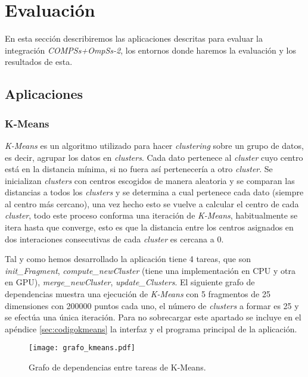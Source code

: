 \section{Evaluación}
\label{sec:estudiorend}

En esta sección describiremos las aplicaciones descritas para evaluar la integración \textit{COMPSs+OmpSs-2}, los entornos donde haremos la evaluación y los resultados de esta.  

\subsection{Aplicaciones}
\subsubsection{K-Means}

\textit{K-Means} es un algoritmo utilizado para hacer \textit{clustering} sobre un grupo de datos, es decir, agrupar los datos en \textit{clusters}. Cada dato pertenece al \textit{cluster} cuyo centro está en la distancia mínima, si no fuera así pertenecería a otro \textit{cluster}. Se inicializan \textit{clusters} con centros escogidos de manera aleatoria y se comparan las distancias a todos los \textit{clusters} y se determina a cual pertenece cada dato (siempre al centro más cercano), una vez hecho esto se vuelve a calcular el centro de cada \textit{cluster}, todo este proceso conforma una iteración de \textit{K-Means}, habitualmente se itera hasta que converge, esto es que la distancia entre los centros asignados en dos interaciones consecutivas de cada \textit{cluster} es cercana a 0.
\par\bigskip
Tal y como hemos desarrollado la aplicación tiene 4 tareas, que son \textit{init\_Fragment}, \textit{compute\_newCluster} (tiene una implementación en CPU y otra en GPU), \textit{merge\_newCluster}, \textit{update\_Clusters}. El siguiente grafo de dependencias muestra una ejecución de \textit{K-Means} con 5 fragmentos de 25 dimensiones con 200000 puntos cada uno, el número de \textit{clusters} a formar es 25 y se efectúa una única iteración. Para no sobrecargar este apartado se incluye en el apéndice \ref{sec:codigokmeans} la interfaz y el programa principal de la aplicación.

\begin{figure}[H]
	\centering 
	\caption{Grafo de dependencias entre tareas de K-Means.}
	\texttt{[image: grafo\_kmeans.pdf]}
	\label{fig:grafokmeans}
\end{figure}

